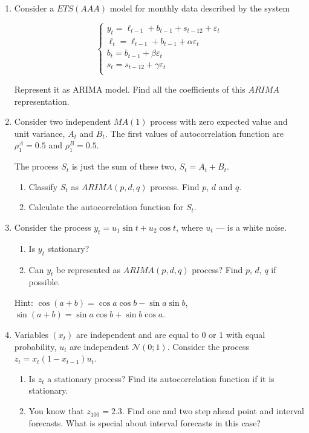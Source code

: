 \documentclass[12pt]{article}
\def \cN{\mathcal{N}}
\begin{document}
\begin{enumerate}
\item Consider a $ETS(AAA)$ model for monthly data described by the system

\[
\begin{cases}
y_t = \ell_{t-1} + b_{t-1} + s_{t-12} +  \varepsilon_t \\
\ell_t = \ell_{t-1} + b_{t-1} + \alpha \varepsilon_t \\
b_t = b_{t-1} + \beta \varepsilon_t \\
s_t = s_{t-12} + \gamma \varepsilon_t \\
\end{cases}
\]

Represent it as ARIMA model. Find all the coefficients of this $ARIMA$ representation.


\newpage
\item Consider two independent $MA(1)$ process with zero expected value and unit variance, $A_t$ and $B_t$.
The first values of autocorrelation function are $\rho_1^A = 0.5$ and $\rho_1^B=0.5$.

The process $S_t$ is just the sum of these two, $S_t = A_t + B_t$.

\begin{enumerate}
	\item Classify $S_t$ as $ARIMA(p, d, q)$ process. Find $p$, $d$ and $q$.
	\item Calculate the autocorrelation function for $S_t$. 
\end{enumerate}

\item Consider the process $y_t = u_1 \sin t + u_2 \cos t$, where $u_t$ — is a white noise.

\begin{enumerate}
	\item Is $y_t$ stationary?
	\item Can $y_t$ be represented as $ARIMA(p, d, q)$ process? Find $p$, $d$, $q$ if possible.
\end{enumerate}

Hint: $\cos(a+b) = \cos a \cos b - \sin a \sin b$, $\sin (a + b) = \sin a \cos b + \sin b \cos a$. 


\item Variables $(x_t)$ are independent and are equal to $0$ or $1$ with equal probability, 
$u_t$ are independent $\cN(0; 1)$. Consider the process $z_t = x_t (1-x_{t-1}) u_t$.

\begin{enumerate}
	\item Is $z_t$ a stationary process? Find its autocorrelation function if it is stationary.
	\item You know that $z_{100} = 2.3$. Find one and two step ahead point and interval forecasts.
	What is special about interval forecasts in this case?
\end{enumerate}


\end{enumerate}
\end{document}

